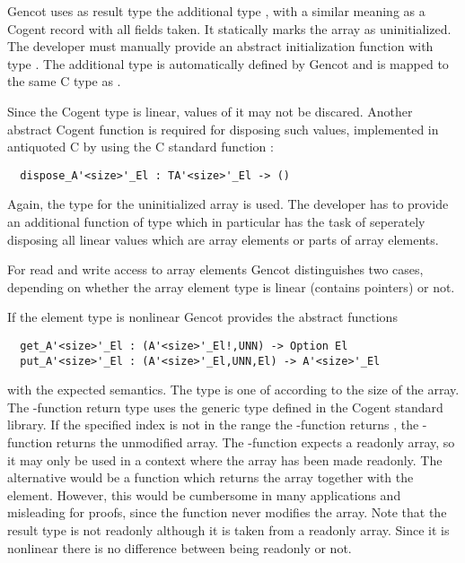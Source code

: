 Gencot uses as result type the additional type , with a similar meaning as a Cogent
record with all fields taken. It statically marks the array as uninitialized. The developer must manually provide
an abstract initialization function with type . The additional type
is automatically defined by Gencot and is mapped to the same C type as .

Since the Cogent type  is linear, values of it may not be discared. Another abstract 
Cogent function is required for
disposing such values, implemented in antiquoted C by using the C standard function :
\begin{verbatim}
  dispose_A'<size>'_El : TA'<size>'_El -> ()
\end{verbatim}
Again, the type for the uninitialized array is used. The developer has to provide an additional function
of type  which in particular has the task of seperately disposing 
all linear values which are array elements or parts of array elements.

For read and write access to array elements Gencot distinguishes two cases, depending on whether the array element
type is linear (contains pointers) or not.

If the element type is nonlinear Gencot provides the abstract functions
\begin{verbatim}
  get_A'<size>'_El : (A'<size>'_El!,UNN) -> Option El
  put_A'<size>'_El : (A'<size>'_El,UNN,El) -> A'<size>'_El
\end{verbatim}
with the expected semantics. The type  is one of  according to the size of the array.
The -function return type uses the generic type  defined in
the Cogent standard library. If the specified index is not in the range  the 
-function returns , the -function returns the unmodified array. The -function 
expects a readonly array, so it may only be used in a context where
the array has been made readonly. The alternative would be a function which returns the array together with the element.
However, this would be cumbersome in many applications and misleading for proofs, since the function never modifies
the array. Note that the result type is not readonly although it is taken from a readonly array. Since it is nonlinear
there is no difference between being readonly or not.

